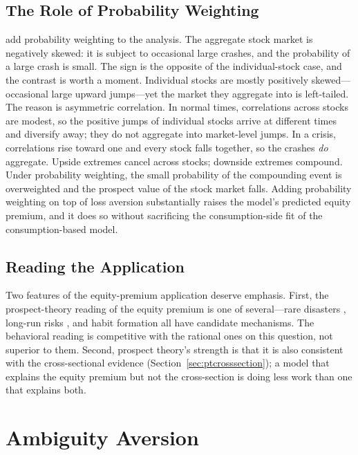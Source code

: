 \subsection{The Role of Probability Weighting}

\citet{degiorgi2012} add probability weighting to the analysis. The aggregate stock market is negatively skewed: it is subject to occasional large crashes, and the probability of a large crash is small. The sign is the opposite of the individual-stock case, and the contrast is worth a moment. Individual stocks are mostly positively skewed---occasional large upward jumps---yet the market they aggregate into is left-tailed. The reason is asymmetric correlation. In normal times, correlations across stocks are modest, so the positive jumps of individual stocks arrive at different times and diversify away; they do not aggregate into market-level jumps. In a crisis, correlations rise toward one and every stock falls together, so the crashes \emph{do} aggregate. Upside extremes cancel across stocks; downside extremes compound. Under probability weighting, the small probability of the compounding event is overweighted and the prospect value of the stock market falls. Adding probability weighting on top of loss aversion substantially raises the model's predicted equity premium, and it does so without sacrificing the consumption-side fit of the consumption-based model.

\subsection{Reading the Application}

Two features of the equity-premium application deserve emphasis. First, the prospect-theory reading of the equity premium is one of several---rare disasters \citep{barro2006}, long-run risks \citep{bansal2004}, and habit formation \citep{campbell1999} all have candidate mechanisms. The behavioral reading is competitive with the rational ones on this question, not superior to them. Second, prospect theory's strength is that it is also consistent with the cross-sectional evidence (Section~\ref{sec:ptcrosssection}); a model that explains the equity premium but not the cross-section is doing less work than one that explains both.

\section{Ambiguity Aversion}
\label{sec:ambiguity}

